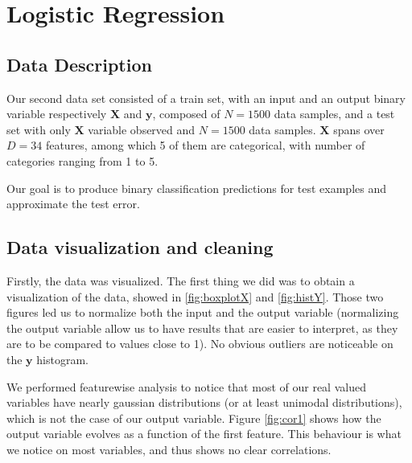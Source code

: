 \documentclass{article} %
\begin{document}
\section{Logistic Regression}
\subsection{Data Description}
Our second data set consisted of a train set, with an input and an output binary
variable respectively $\mathbf{X}$ and $\mathbf{y}$, composed of $N=1500$ data
samples, and a test set with only $\mathbf{X}$ variable observed and $N=1500$
data samples. $\mathbf{X}$ spans over $D=34$ features, among which 5 of them are
categorical, with number of categories ranging from 1 to 5.

Our goal is to produce binary classification predictions for test examples and approximate the
test error.

\subsection{Data visualization and cleaning}
Firstly, the data was visualized. The first thing we
did was to obtain a visualization of the data, showed in \ref{fig:boxplotX} and
\ref{fig:histY}. Those two figures led us to normalize both the input and the
output variable (normalizing the output variable allow us to have results that are
easier to interpret, as they are to be compared to values close to 1). No
obvious outliers are noticeable on the $\mathbf{y}$ histogram.

We performed featurewise analysis to notice that most of our real valued
variables have nearly gaussian distributions (or at least unimodal
distributions), which is not the case of our output variable. Figure
\ref{fig:cor1} shows how the output variable evolves as a function of the first
feature. This behaviour is what we notice on most variables, and thus shows no
clear correlations.
\end{document}
